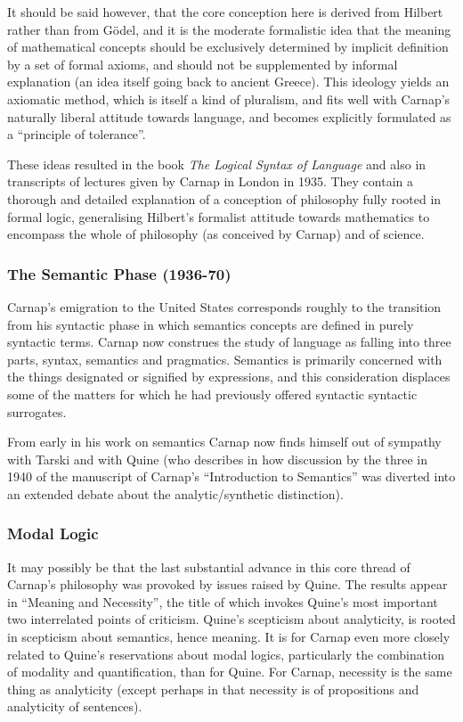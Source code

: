 \documentclass[10pt,titlepage]{book}
\def\ouml{\"o}
\begin{document}
It should be said however, that the core conception here is derived from Hilbert rather than from G{\ouml}del, and it is the moderate formalistic idea that the meaning of mathematical concepts should be exclusively determined by implicit definition by a set of formal axioms, and should not be supplemented by informal explanation (an idea itself going back to ancient Greece).
This ideology yields an axiomatic method, which is itself a kind of pluralism, and fits well with Carnap's naturally liberal attitude towards language, and becomes explicitly formulated as a ``principle of tolerance''.

These ideas resulted in the book \emph{The Logical Syntax of Language} \cite{carnap34,carnap37} and also in transcripts \cite{carnap35} of lectures given by Carnap in London in 1935.
They contain a thorough and detailed explanation of a conception of philosophy fully rooted in formal logic, generalising Hilbert's formalist attitude towards mathematics to encompass the whole of philosophy (as conceived by Carnap) and of science.

\subsubsection{The Semantic Phase (1936-70)}

Carnap's emigration to the United States corresponds roughly to the transition from his syntactic phase in which semantics concepts are defined in purely syntactic terms.
Carnap now construes the study of language as falling into three parts, syntax, semantics and pragmatics.
Semantics is primarily concerned with the things designated or signified by expressions, and this consideration displaces some of the matters for which he had previously offered syntactic syntactic surrogates.

From early in his work on semantics Carnap now finds himself out of sympathy with Tarski and with Quine (who describes in \cite{quineAB}\cite{quine86} how discussion by the three in 1940 of the manuscript of Carnap's ``Introduction to Semantics'' was diverted into an extended debate about the analytic/synthetic distinction).

\subsubsection{Modal Logic}

It may possibly be that the last substantial advance in this core thread of Carnap's philosophy was provoked by issues raised by Quine.
The results appear in ``Meaning and Necessity'', the title of which invokes Quine's most important two interrelated points of criticism.
Quine's scepticism about analyticity, is rooted in scepticism about semantics, hence meaning.
It is for Carnap even more closely related to Quine's reservations about modal logics, particularly the combination of modality and quantification, than for Quine.
For Carnap, necessity is the same thing as analyticity (except perhaps in that necessity is of propositions and analyticity of sentences).
\end{document}
